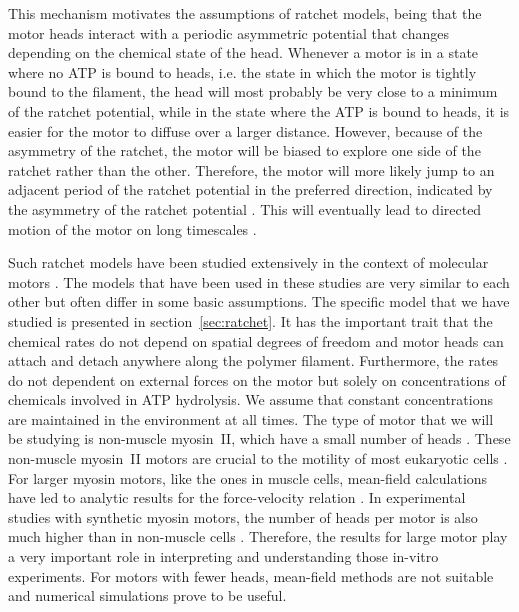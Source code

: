 \documentclass[aps,pre,twocolumn,showpacs,showkeys,superscriptaddress,floatfix]{revtex4-1}
\begin{document}
This mechanism motivates the assumptions of ratchet models, 
being that the motor heads interact with a periodic asymmetric potential that changes depending on the chemical state of the head. 
Whenever a motor is in a state where no ATP is bound to heads, i.e. the state in which the motor is tightly bound to the filament, 
the head will most probably be very close to a minimum of the ratchet potential, 
while in the state where the ATP is bound to heads, it is easier for the motor to diffuse over a larger distance. 
However, because of the asymmetry of the ratchet, the motor will be biased to explore one side of the ratchet rather than the other. 
Therefore, the motor will more likely jump to an adjacent period of the ratchet potential in the preferred direction, indicated by the asymmetry of the ratchet potential \cite{reimann2002brownian}.
This will eventually lead to directed motion of the motor on long timescales \cite{hoffmann2016molecular,Reimann2002introduction,de2007symmetries}. 

Such ratchet models have been studied extensively in the context of molecular motors \cite{reimann2002brownian,astumian1994fluctuation,astumian1996mechanochemical,julicher1997modeling,Reimann2002introduction,julicher1997spontaneous,peskin1995correlation,huxley1969mechanism,huxley1971proposed}.
The models that have been used in these studies are very similar to each other but often differ in some basic assumptions.
The specific model that we have studied is presented in section~\ref{sec:ratchet}. 
It has the important trait that the chemical rates do not depend on spatial degrees of freedom and motor heads can attach and detach anywhere along the polymer filament.
Furthermore, the rates do not dependent on external forces on the motor but solely on concentrations of chemicals involved in ATP hydrolysis. 
We assume that constant concentrations are maintained in the environment at all times. 
The type of motor that we will be studying is non-muscle myosin~II, which have a small number of heads \cite{pollard1982structure}. 
These non-muscle myosin~II motors are crucial to the motility of most eukaryotic cells \cite{vicente2009non}.
For larger myosin motors, like the ones in muscle cells, mean-field calculations have led to analytic results for the force-velocity relation \cite{julicher1997modeling}.
In experimental studies with synthetic myosin motors, the number of heads per motor is also much higher than in non-muscle cells \cite{brown2009cross-correlated}. 
Therefore, the results for large motor play a very important role in interpreting and understanding those in-vitro experiments.
For motors with fewer heads, mean-field methods are not suitable and numerical simulations prove to be useful.
\end{document}
